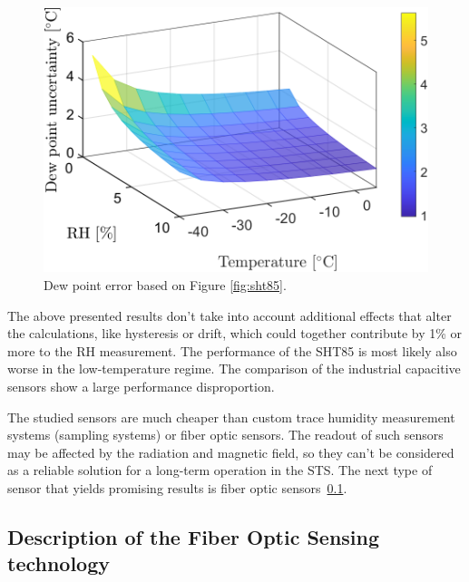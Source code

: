 \begin{figure}[!h]
\centering
\includegraphics[width=0.6\columnwidth]{Chapter5/images/SHTRH15T02.png}
\caption{Dew point error based on Figure \ref{fig:sht85}.}
\label{fig:sht85_dp}
\end{figure}
\newpage
The above presented results don't take into account additional effects that alter the calculations, like hysteresis or drift, which could together contribute by 1\% or more to the \gls{RH} measurement. The performance of the SHT85 is most likely also worse in the low-temperature regime. The comparison of the industrial capacitive sensors show a large performance disproportion.

The studied sensors are much cheaper than custom trace humidity measurement systems (sampling systems) or fiber optic sensors. The readout of such sensors may be affected by the radiation and magnetic field, so they can't be considered as a reliable solution for a long-term operation in the \gls{STS}. The next type of sensor that yields promising results is fiber optic sensors~\ref{FOS}.

\subsection{Description of the Fiber Optic Sensing technology}
\label{FOS}

